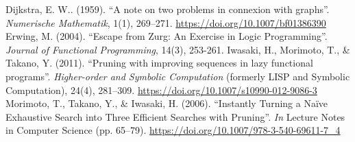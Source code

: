 \documentclass[journal,onecolumn,12pt]{IEEEtran}
\begin{document}
\begin{thebibliography}{6}
       Dijkstra, E. W.. (1959). ``A note on two problems in connexion with graphs''. \textit{Numerische Mathematik}, 1(1), 269–271. \url{https://doi.org/10.1007/bf01386390}
       Erwing, M. (2004). ``Escape from Zurg: An Exercise in Logic Programming''. \textit{Journal of Functional Programming}, 14(3), 253-261.
       Iwasaki, H., Morimoto, T., \& Takano, Y. (2011). ``Pruning with improving sequences in lazy functional programs''. \textit{Higher-order and Symbolic Computation} (formerly LISP and Symbolic Computation), 24(4), 281–309. \url{https://doi.org/10.1007/s10990-012-9086-3}
       Morimoto, T., Takano, Y., \& Iwasaki, H. (2006). ``Instantly Turning a Naïve Exhaustive Search into Three Efficient Searches with Pruning''. \textit{In} Lecture Notes in Computer Science (pp. 65–79). \url{https://doi.org/10.1007/978-3-540-69611-7_4}

\end{thebibliography}
              
\end{document}
